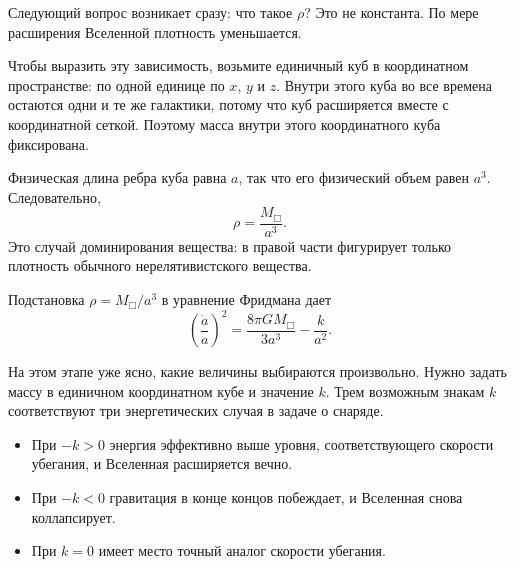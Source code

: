Следующий вопрос возникает сразу: что такое \(\rho\)? Это не константа. По мере расширения Вселенной плотность уменьшается.

Чтобы выразить эту зависимость, возьмите единичный куб в координатном пространстве: по одной единице по \(x\), \(y\) и \(z\). Внутри этого куба во все времена остаются одни и те же галактики, потому что куб расширяется вместе с координатной сеткой. Поэтому масса внутри этого координатного куба фиксирована.


Физическая длина ребра куба равна \(a\), так что его физический объем равен \(a^3\). Следовательно,
\begin{equation}
\rho=\frac{M_{\Box}}{a^3}.
\end{equation}
Это случай доминирования вещества: в правой части фигурирует только плотность обычного нерелятивистского вещества.

\begin{classroomqa}
\end{classroomqa}

Подстановка \(\rho=M_{\Box}/a^3\) в уравнение Фридмана дает
\begin{equation}
\left(\frac{\dot a}{a}\right)^2=\frac{8\pi G M_{\Box}}{3a^3}-\frac{k}{a^2}.
\end{equation}

На этом этапе уже ясно, какие величины выбираются произвольно. Нужно задать массу в единичном координатном кубе и значение \(k\). Трем возможным знакам \(k\) соответствуют три энергетических случая в задаче о снаряде.

\begin{itemize}
\item При \(-k>0\) энергия эффективно выше уровня, соответствующего скорости убегания, и Вселенная расширяется вечно.
\item При \(-k<0\) гравитация в конце концов побеждает, и Вселенная снова коллапсирует.
\item При \(k=0\) имеет место точный аналог скорости убегания.
\end{itemize}

